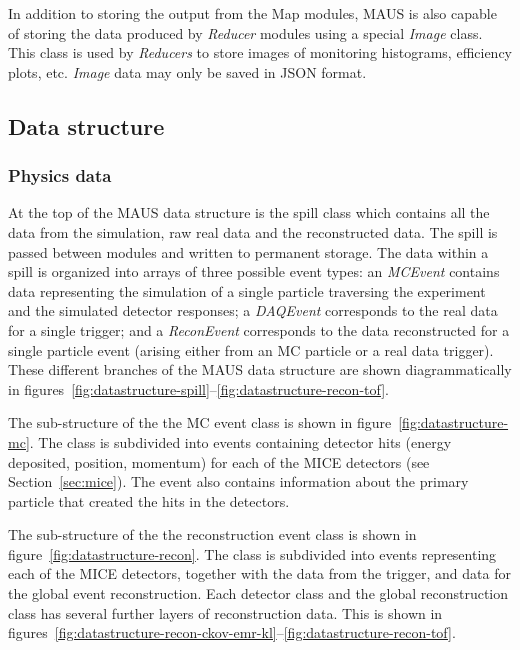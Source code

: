 \documentclass{JINST}
\begin{document}
In addition to storing the output from the Map modules, MAUS is also capable of storing the data  produced by  \emph{Reducer} modules using a special \emph{Image} class. This class is used by \emph{Reducers} to store images of monitoring histograms, efficiency plots, etc. \emph{Image} data may only be saved in JSON format.

%
\subsection{Data structure}\label{sec:maus-datastr}

\subsubsection{Physics data} \label{sec:physics-datastr}

At the top of the MAUS data structure is the spill class which contains all the data from the simulation, raw real data and the reconstructed data. The spill is passed between modules and written to permanent storage. The data within a spill is organized into arrays of three possible event types: an \emph{MCEvent} contains data  representing the simulation of a single particle traversing the experiment and the simulated detector responses; a \emph{DAQEvent} corresponds to the real data for a single trigger; and a \emph{ReconEvent} corresponds to the data reconstructed for a single particle event (arising either from an MC particle or a real data trigger). These different branches of the MAUS data structure are shown diagrammatically in figures~\ref{fig:datastructure-spill}--\ref{fig:datastructure-recon-tof}.

The sub-structure of the the MC event class is shown in figure~\ref{fig:datastructure-mc}. The class is subdivided into events containing detector hits (energy deposited, position, momentum) for each of the MICE detectors (see Section~\ref{sec:mice}). The event also contains information about the primary particle that created the hits in the detectors.

The sub-structure of the the reconstruction event class is shown in figure~\ref{fig:datastructure-recon}. The class is subdivided into events representing each of the MICE detectors, together with the data from the trigger, and data for the global event reconstruction. Each detector class and the global reconstruction class has several further layers of reconstruction data. This is shown in figures~\ref{fig:datastructure-recon-ckov-emr-kl}--\ref{fig:datastructure-recon-tof}.
\end{document}
